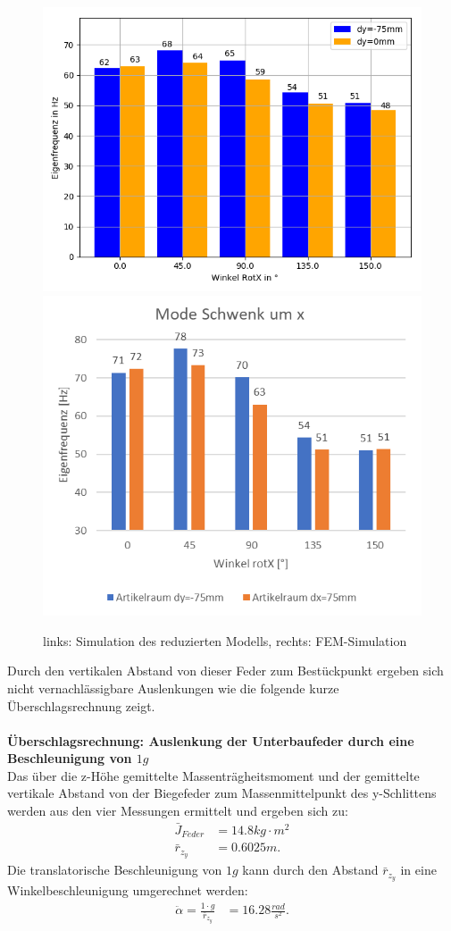 \documentclass[10pt,a4paper]{iace.report}
\begin{document}
					\begin{figure}
						\centering
						\includegraphics[width=0.49\linewidth]{./pics/eigenfreq_starr.png}
						\includegraphics[width=0.49\linewidth]{./pics/eigenfreq_ref.png}
						\caption{links: Simulation des reduzierten Modells, rechts: FEM-Simulation}
						\label{fig:nat_freq}
					\end{figure}
					Durch den vertikalen Abstand von dieser Feder zum Bestückpunkt ergeben sich nicht vernachlässigbare Auslenkungen wie die folgende kurze Überschlagsrechnung zeigt. \\\\
					\textbf{Überschlagsrechnung: Auslenkung der Unterbaufeder durch eine Beschleunigung von $ 1g $}\\
					Das über die z-Höhe gemittelte Massenträgheitsmoment und der gemittelte vertikale Abstand von der Biegefeder zum Massenmittelpunkt des y-Schlittens werden aus den vier Messungen ermittelt und ergeben sich zu:
					\begin{align*}
						\bar{J}_{Feder} &= 14.8 kg\cdot m^{2}\\
						\bar{r}_{z_{y}} &= 0.6025 m.
					\end{align*}
					Die translatorische Beschleunigung von $ 1g $ kann durch den Abstand $ \bar{r}_{z_{y}} $ in eine Winkelbeschleunigung umgerechnet werden:	
					\begin{align*}
						\ddot{\alpha} = \frac{1\cdot g}{\bar{r}_{z_{y}}} &= 16.28\frac{rad}{s^{2}}.
					\end{align*}
\end{document}
